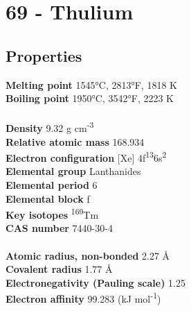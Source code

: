 \section{69 - Thulium}
\label{sec:elem-thulium}
\subsection{Properties}
\textbf{Melting point} 1545°C, 2813°F, 1818 K\\
\textbf{Boiling point} 1950°C, 3542°F, 2223 K\\
\\
\textbf{Density} 9.32 g cm\textsuperscript{-3}\\
\textbf{Relative atomic mass} 168.934\\
\textbf{Electron configuration} [Xe] 4f\textsuperscript{13}6s\textsuperscript{2}\\
\textbf{Elemental group} Lanthanides\\
\textbf{Elemental period} 6\\
\textbf{Elemental block} f\\
\textbf{Key isotopes} \textsuperscript{169}Tm\\
\textbf{CAS number} 7440-30-4\\
\\
\textbf{Atomic radius, non-bonded} 2.27 Å\\
\textbf{Covalent radius} 1.77 Å\\
\textbf{Electronegativity (Pauling scale)} 1.25\\
\textbf{Electron affinity} 99.283 (kJ mol\textsuperscript{-1})\\